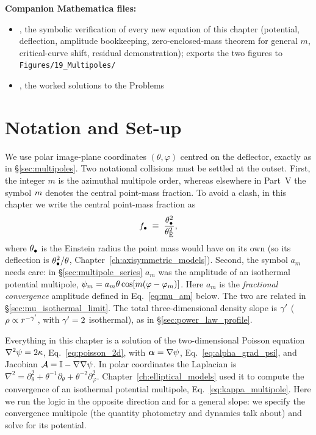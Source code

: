 \medskip
\noindent
\textbf{Companion Mathematica files:}
\begin{itemize}[nosep]
    \item {},
          the symbolic verification of every new equation of this
          chapter (potential, deflection, amplitude bookkeeping,
          zero-enclosed-mass theorem for general $m$, critical-curve
          shift, residual demonstration); exports the two figures to
          \texttt{Figures/19\_Multipoles/}
    \item {},
          the worked solutions to the Problems
\end{itemize}


\section{Notation and Set-up}
\label{sec:mu_notation}

We use polar image-plane coordinates $(\theta,\varphi)$ centred on the
deflector, exactly as in \S\ref{sec:multipoles}.  Two notational
collisions must be settled at the outset.  First, the integer $m$ is
the azimuthal multipole order, whereas elsewhere in Part~V the symbol
$m$ denotes the central point-mass fraction.  To avoid a clash, in
this chapter we write the central point-mass fraction as
\begin{equation}
    f_\bullet \;\equiv\; \frac{\theta_{\bullet}^2}{\theta_{\mathrm{E}}^2},
    \label{eq:mu_fbullet}
\end{equation}
where $\theta_{\bullet}$ is the Einstein radius the point mass would have on
its own (so its deflection is $\theta_{\bullet}^2/\theta$,
Chapter~\ref{ch:axisymmetric_models}).  Second, the symbol $a_m$ needs
care: in \S\ref{sec:multipole_series} $a_m$ was the amplitude of an isothermal
potential multipole, $\psi_m = a_m\theta\cos[m(\varphi-\varphi_m)]$.
Here $a_m$ is the \emph{fractional convergence} amplitude defined in
Eq.~\eqref{eq:mu_am} below.  The two are related in
\S\ref{sec:mu_isothermal_limit}.
The total three-dimensional density slope is $\gamma'$ ($\rho\propto
r^{-\gamma'}$, with $\gamma'=2$ isothermal), as in
\S\ref{sec:power_law_profile}.

\begin{bridge}
Everything in this chapter is a solution of the two-dimensional Poisson
equation $\nabla^2\psi = 2\kappa$, Eq.~\eqref{eq:poisson_2d}, with
$\boldsymbol{\alpha} = \nabla\psi$, Eq.~\eqref{eq:alpha_grad_psi}, and Jacobian
$\mathcal{A} = \mathbb{I} - \nabla\nabla\psi$.  In polar coordinates the
Laplacian is $\nabla^2 = \partial_\theta^2 + \theta^{-1}\partial_\theta
+ \theta^{-2}\partial_\varphi^2$.  Chapter~\ref{ch:elliptical_models}
used it to compute the convergence of an isothermal potential
multipole, Eq.~\eqref{eq:kappa_multipole}.  Here we run the logic in
the opposite direction and for a general slope: we specify the
convergence multipole (the quantity photometry and dynamics talk about)
and solve for its potential.
\end{bridge}


